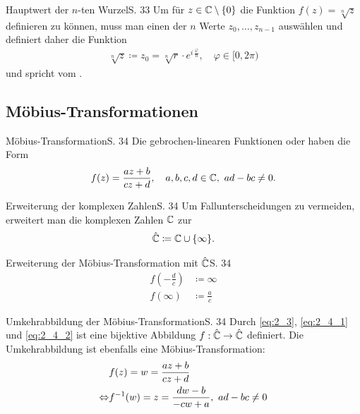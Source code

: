 \begin{bemerkung}{Hauptwert der $n$-ten Wurzel}{S. 33}
  Um für $z \in \mathbb{C}\setminus\{0\}$ die Funktion $f(z) = \sqrt[n]{z}$ definieren zu können, muss man einen der $n$ Werte $z_0, \dots, z_{n-1}$ auswählen und definiert daher die Funktion
  \begin{align}
    \sqrt[n]{z} \coloneqq z_0 = \sqrt[n]{r} \cdot e^{i \, \frac{\varphi}{n}}, \quad \varphi \in [0, 2\pi)
  \end{align}
  und spricht vom .
\end{bemerkung}



\subsection{Möbius-Transformationen}

\begin{bemerkung}{Möbius-Transformation}{S. 34}
  Die gebrochen-linearen Funktionen oder  haben die Form
  \begin{align}
    f(z) = \frac{az + b}{cz + d}, \quad a,b,c,d \in \mathbb{C}, \ ad-bc \neq 0 . \label{eq:2_3}
  \end{align}
\end{bemerkung}

\begin{bemerkung}{Erweiterung der komplexen Zahlen}{S. 34}
  Um Fallunterscheidungen zu vermeiden, erweitert man die komplexen Zahlen $\mathbb{C}$ zur 
  \begin{align}
    \hat{\mathbb{C}} \coloneqq \mathbb{C} \cup \{\infty\} .
  \end{align}
\end{bemerkung}

\begin{bemerkung}{Erweiterung der Möbius-Transformation mit $\hat{\mathbb{C}}$}{S. 34}
  \begin{align}
    f \left( - \frac{d}{c} \right) &\coloneqq \infty \label{eq:2_4_1}\\
    f(\infty) &\coloneqq \frac{a}{c} \label{eq:2_4_2}
  \end{align}
\end{bemerkung}

\begin{bemerkung}{Umkehrabbildung der Möbius-Transformation}{S. 34}
  Durch \eqref{eq:2_3}, \eqref{eq:2_4_1} und \eqref{eq:2_4_2} ist eine bijektive Abbildung $f : \hat{\mathbb{C}} \to \hat{\mathbb{C}}$ definiert.
  Die Umkehrabbildung ist ebenfalls eine Möbius-Transformation:
  \begin{align}
    & f(z) = w = \frac{az + b}{cz + d} \notag\\
    \Leftrightarrow & f^{-1}(w) = z = \frac{dw - b}{-cw + a}, \ ad-bc \neq 0
  \end{align}
\end{bemerkung}

